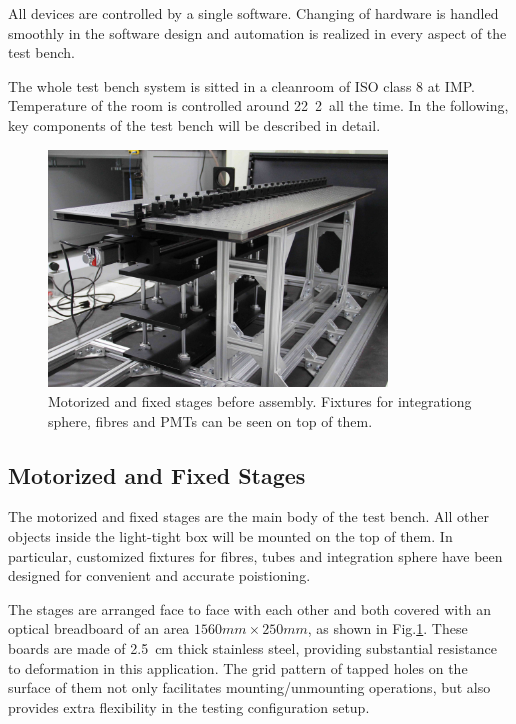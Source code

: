 \documentclass[review,number,sort&compress]{elsarticle}
\begin{document}
All devices are controlled by a single software.
Changing of hardware is handled smoothly in the software design and automation is realized in every aspect of the test bench.

The whole test bench system is sitted in a cleanroom of ISO class 8 at IMP.
Temperature of the room is controlled around 22\textpm~2\textcelsius~all the time.
In the following, key components of the test bench will be described in detail.

\begin{figure}
 \centering
 \includegraphics[width=90mm]{stage1_crop}
\caption{Motorized and fixed stages before assembly.
Fixtures for integrationg sphere, fibres and PMTs can be seen on top of them.}
\label{fig:stages}
\end{figure} 

\subsection{Motorized and Fixed Stages}
\label{sec:stages}

The motorized and fixed stages are the main body of the test bench.
All other objects inside the light-tight box will be mounted on the top of them.
In particular, customized fixtures for fibres, tubes and integration sphere have been designed for convenient and accurate poistioning.

The stages are arranged face to face with each other and both covered with an optical breadboard of an area $1560mm\times250mm$, as shown in Fig.\ref{fig:stages}.
These boards are made of \SI{2.5}{cm} thick stainless steel, providing substantial resistance to deformation in this application.
The grid pattern of tapped holes on the surface of them not only facilitates mounting/unmounting operations, but also provides extra flexibility in the testing configuration setup.
\end{document}
